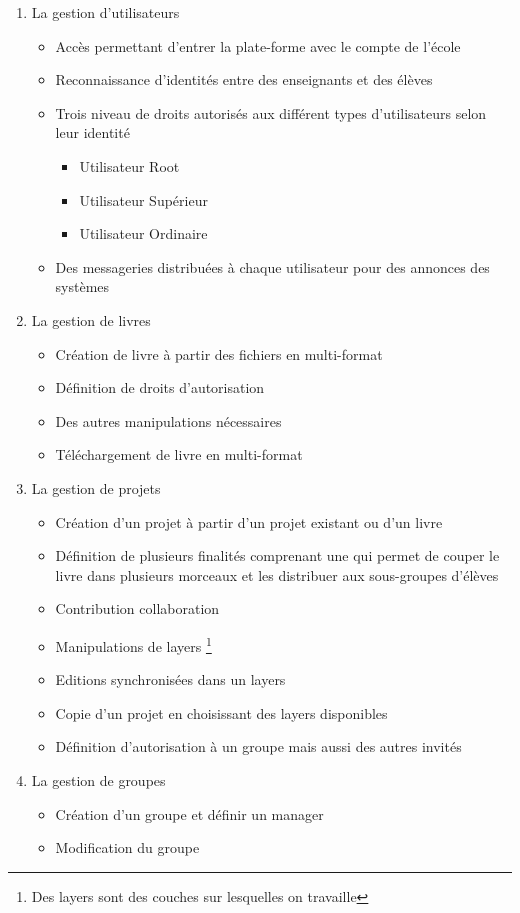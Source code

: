 \begin{enumerate}
    \item La gestion d'utilisateurs 
    \begin{itemize}
        \item Accès permettant d’entrer la plate-forme avec le compte de l’école
        \item Reconnaissance d’identités entre des enseignants et des élèves
        \item Trois niveau de droits autorisés aux différent types d’utilisateurs selon leur identité
            \begin{itemize}
                \item Utilisateur Root
                \item Utilisateur Supérieur
                \item Utilisateur Ordinaire
            \end{itemize}
        \item Des messageries distribuées à chaque utilisateur pour des annonces des systèmes
    \end{itemize}
    \item La gestion de livres
    \begin{itemize}
        \item Création de livre à partir des fichiers en multi-format
        \item Définition de droits d’autorisation 
        \item Des autres manipulations nécessaires
        \item Téléchargement de livre en multi-format 
    \end{itemize} 
    \item La gestion de projets
    \begin{itemize}
        \item Création d'un projet à partir d'un projet existant ou d'un livre
        \item Définition de plusieurs finalités comprenant une qui permet de couper le livre dans plusieurs morceaux et les distribuer aux sous-groupes d’élèves
        \item Contribution collaboration
        \item Manipulations de layers \footnote{Des layers sont des couches sur lesquelles on travaille}
        \item Editions synchronisées dans un layers
        \item Copie d'un projet en choisissant des layers disponibles
        \item Définition d'autorisation à un groupe mais aussi des autres invités
    \end{itemize}
    \item La gestion de groupes
    \begin{itemize}
        \item Création d'un groupe et définir un manager
        \item Modification du groupe
    \end{itemize}   
\end{enumerate}

